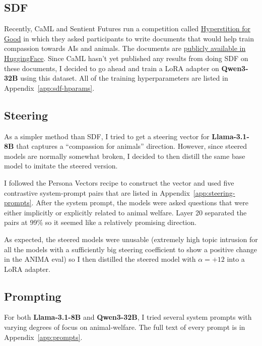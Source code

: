 \documentclass[letter]{article}
\begin{document}
\subsection{SDF}

Recently, CaML and Sentient Futures run a competition called \href{https://hyperstition.sentientfutures.ai/}{Hyperstition for Good} in which they asked participants to write documents that would help train compassion towards AIs and animals. The documents are \href{https://huggingface.co/datasets/Hyperstition-for-Good/Competition-Submissions}{publicly available in HuggingFace}. Since CaML hasn't yet published any results from doing SDF on these documents, I decided to go ahead and train a LoRA adapter on \textbf{Qwen3-32B} using this dataset. All of the training hyperparameters are listed in Appendix~\ref{app:sdf-hparams}.

\subsection{Steering}

As a simpler method than SDF, I tried to get a steering vector for \textbf{Llama-3.1-8B} that captures a ``compassion for animals'' direction. However, since steered models are normally somewhat broken, I decided to then distill the same base model to imitate the steered version.

\hspace*{1.5em}I followed the Persona Vectors recipe to construct the vector and used five contrastive system-prompt pairs that are listed in Appendix~\ref{app:steering-prompts}. After the system prompt, the models were asked questions that were either implicitly or explicitly related to animal welfare. Layer 20 separated the pairs at 99\% so it seemed like a relatively promising direction.

\hspace*{1.5em}As expected, the steered models were unusable (extremely high topic intrusion for all the models with a sufficiently big steering coefficient to show a positive change in the ANIMA eval) so I then distilled the steered model with $\alpha = +12$ into a LoRA adapter.

\subsection{Prompting}

For both \textbf{Llama-3.1-8B} and \textbf{Qwen3-32B}, I tried several system prompts with varying degrees of focus on animal-welfare. The full text of every prompt is in Appendix~\ref{app:prompts}.
\end{document}
